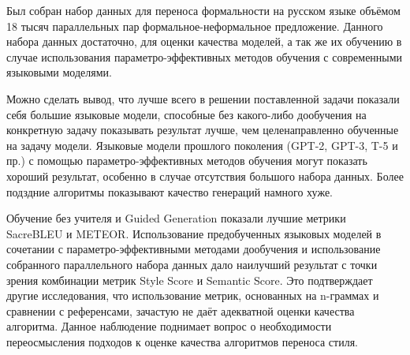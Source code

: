 \Conclusion %

Был собран набор данных для переноса формальности на русском языке объёмом 18 тысяч параллельных пар формальное-неформальное предложение.
Данного набора данных достаточно, для оценки качества моделей, а так же их обучению в случае использования параметро-эффективных методов обучения с современными языковыми моделями.

Можно сделать вывод, что лучше всего в решении поставленной задачи показали себя большие языковые модели, способные без какого-либо дообучения на конкретную задачу показывать результат лучше, чем целенаправленно обученные на задачу модели.
Языковые модели прошлого поколения (GPT-2, GPT-3, T-5 и пр.) с помощью параметро-эффективных методов обучения могут показать хороший результат, особенно в случае отсутствия большого набора данных.
Более подздние алгоритмы показывают качество генераций намного хуже.

Обучение без учителя и Guided Generation показали лучшие метрики SacreBLEU и METEOR.
Использование предобученных языковых моделей в сочетании с параметро-эффективными методами дообучения и использование собранного параллельного набора данных дало наилучший результат с точки зрения комбинации метрик Style Score и Semantic Score.
Это подтверждает другие исследования, что использование метрик, основанных на n-граммах и сравнении с референсами, зачастую не даёт адекватной оценки качества алгоритма.
Данное наблюдение поднимает вопрос о необходимости переосмысления подходов к оценке качества алгоритмов переноса стиля.


